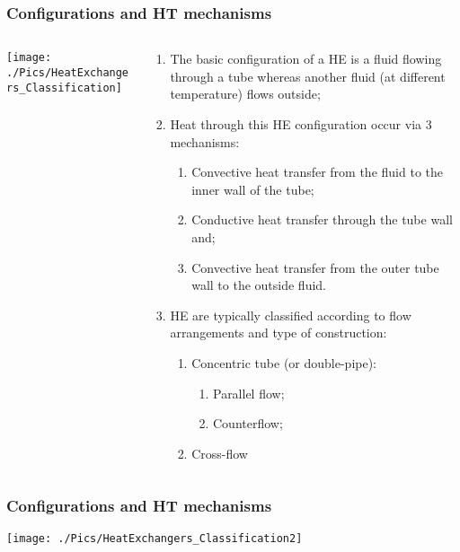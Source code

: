 \documentclass[10pt,compress,unknownkeysallowed]{beamer}
\begin{document}
\begin{frame}
  \frametitle{Configurations and HT mechanisms}
    \begin{columns}
       \begin{column}[l]{0.5\linewidth}
         \texttt{[image: ./Pics/HeatExchangers\_Classification]}
       \end{column}
       \begin{column}[l]{0.5\linewidth}
         \begin{enumerate}\scriptsize
            \item<1-> The basic configuration of a HE is a fluid flowing through a tube whereas another fluid (at different temperature) flows outside;
            \item<2-> Heat through this HE configuration occur via 3 mechanisms:
              \begin{enumerate}\scriptsize
                 \item<2-> Convective heat transfer from the fluid to the inner wall of the tube;
                 \item<2-> Conductive heat transfer through the tube wall and;
                 \item<2-> Convective heat transfer from the outer tube wall to the outside fluid.
              \end{enumerate}
            \item<3-> HE are typically classified according to flow arrangements and type of construction:
              \begin{enumerate}\scriptsize
                  \item<3-> Concentric tube (or double-pipe):
                       \begin{enumerate}\scriptsize
                          \item<3-> Parallel flow;
                          \item<3-> Counterflow;
                       \end{enumerate}
                  \item<3-> Cross-flow
              \end{enumerate}
         \end{enumerate}
       \end{column}      
    \end{columns}
\end{frame}


\begin{frame}
  \frametitle{Configurations and HT mechanisms}
    \begin{center}
         \texttt{[image: ./Pics/HeatExchangers\_Classification2]}
    \end{center}
\end{frame}
\end{document}
